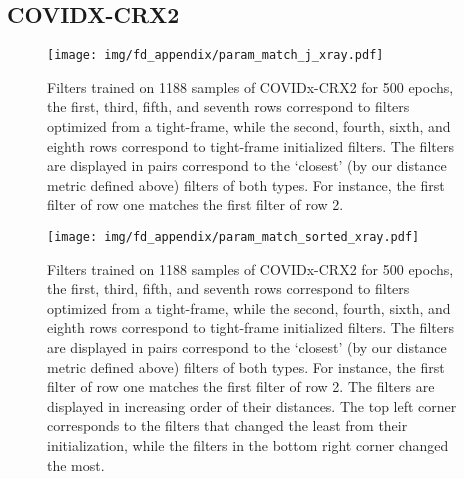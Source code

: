 \documentclass[10pt,twocolumn,letterpaper]{article}
\begin{document}
\subsection{COVIDX-CRX2}
\begin{figure}[H]
    \centering
    \texttt{[image: img/fd\_appendix/param\_match\_j\_xray.pdf]}
    \vspace{-50pt}
    \caption{Filters trained on 1188 samples of COVIDx-CRX2 for 500 epochs, the first, third, fifth, and seventh rows correspond to filters optimized from a tight-frame, while the second, fourth, sixth, and eighth rows correspond to tight-frame initialized filters. The filters are displayed in pairs correspond to the `closest' (by our distance metric defined above) filters of both types. For instance, the first filter of row one matches the first filter of row 2.}
    \label{fig:covidj}
\end{figure}
\clearpage
\begin{figure}[H]
    \centering
    \texttt{[image: img/fd\_appendix/param\_match\_sorted\_xray.pdf]}
    \vspace{-50pt}
    \caption{Filters trained on 1188 samples of COVIDx-CRX2 for 500 epochs, the first, third, fifth, and seventh rows correspond to filters optimized from a tight-frame, while the second, fourth, sixth, and eighth rows correspond to tight-frame initialized filters. The filters are displayed in pairs correspond to the `closest' (by our distance metric defined above) filters of both types. For instance, the first filter of row one matches the first filter of row 2. The filters are displayed in increasing order of their distances. The top left corner corresponds to the filters that changed the least from their initialization, while the filters in the bottom right corner changed the most.}
    \label{fig:covidsorted}
\end{figure}

\clearpage
\end{document}

